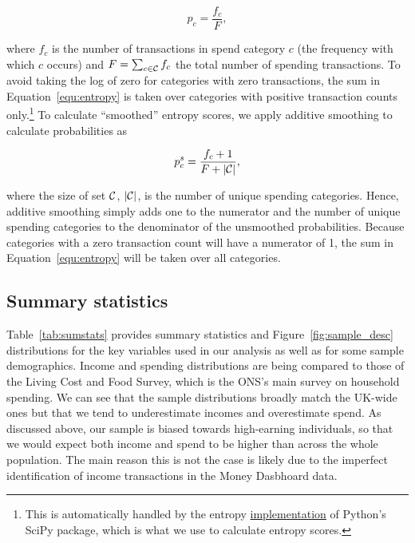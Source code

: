 \begin{equation}
    p_c = \frac{f_c}{F},
\end{equation}

\noindent where $f_c$ is the number of transactions in spend category $c$ (the
frequency with which $c$ occurs) and $F = \sum_{c \in \mathcal{C}}f_c$ the total
number of spending transactions. To avoid taking the log of zero for categories
with zero transactions, the sum in Equation~\ref{equ:entropy} is taken over
categories with positive transaction counts only.\footnote{This is
    automatically handled by the entropy
    \href{https://docs.scipy.org/doc/scipy/reference/generated/scipy.stats.entropy.html}{implementation}
of Python's SciPy package, which is what we use to calculate entropy scores.}
To calculate ``smoothed'' entropy scores, we apply additive smoothing to
calculate probabilities as

\begin{equation}
    \label{equ:prob_s}
    p_c^{s} = \frac{f_c + 1}{F + |\mathcal{C}|},
\end{equation}

\noindent where the size of set $\mathcal{C}$, $|\mathcal{C}|$, is the number of unique
spending categories. Hence, additive smoothing simply adds one to the numerator
and the number of unique spending categories to the denominator of the
unsmoothed probabilities. Because categories with a zero transaction count will
have a numerator of 1, the sum in Equation~\ref{equ:entropy} will be taken over
all categories.


\subsection{Summary statistics}%
\label{par:summary_statistics}

Table~\ref{tab:sumstats} provides summary statistics and
Figure~\ref{fig:sample_desc} distributions for the key variables used in our
analysis as well as for some sample demographics. Income and spending
distributions are being compared to those of the Living Cost and Food
Survey, which is the ONS's main survey on household spending. We can see that
the sample distributions broadly match the UK-wide ones but that we tend to
underestimate incomes and overestimate spend. As discussed above, our sample is
biased towards high-earning individuals, so that we would expect both income
and spend to be higher than across the whole population. The main reason this
is not the case is likely due to the imperfect identification of income
transactions in the Money Dasbhoard data.

